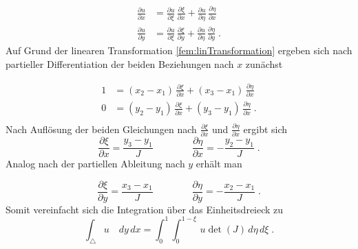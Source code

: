 \begin{equation}
\begin{split}
	\frac{\partial u}{\partial x} &= \frac{\partial u}{\partial \xi} \, \frac{\partial \xi}{\partial x} + \frac{\partial u}{\partial \eta} \, \frac{\partial \eta}{\partial x} \\
	\frac{\partial u}{\partial y} &= \frac{\partial u}{\partial \xi} \, \frac{\partial \xi}{\partial y} + \frac{\partial u}{\partial \eta} \, \frac{\partial \eta}{\partial y} \; .
	\end{split}
\end{equation}
Auf Grund der linearen Transformation \eqref{fem:linTransformation} ergeben sich nach partieller Differentiation der beiden Beziehungen nach $x$ zunächst

\begin{equation}
			\begin{aligned}
			1  &= (x_2 -x_1) \, \frac{\partial \xi}{\partial x} + (x_3 -x_1) \, \frac{\partial \eta}{\partial x} \\
			0 &= (y_2 -y_1) \, \frac{\partial \xi}{\partial x} + (y_3 -y_1) \, \frac{\partial \eta}{\partial x} \; . \\
			 \end{aligned}
\end{equation}
Nach Auflösung  der beiden Gleichungen nach $\frac{\partial \xi}{\partial x}$ und $\frac{\partial \eta}{\partial x}$ ergibt sich
\begin{equation}
			\frac{\partial \xi}{\partial x} = \frac{y_3 - y_1}{J} \qquad \qquad \frac{\partial \eta}{\partial x} = -\frac{y_2 - y_1}{J} \; .
\end{equation}
Analog nach der partiellen Ableitung nach $y$ erhält man

\begin{equation}
			\frac{\partial \xi}{\partial y} = \frac{x_3 - x_1}{J} \qquad \qquad \frac{\partial \eta}{\partial y} = -\frac{x_2 - x_1}{J} \; .
\end{equation}
Somit vereinfacht sich die Integration über das Einheitsdreieck zu
\begin{equation}
			\int_{\triangle} u \quad dy \, dx = \int_0^1 \int_0^{1 - \xi} \, u \det (J) \, d \eta \, d \xi \; .
\end{equation}

